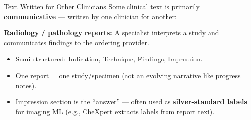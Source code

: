 \documentclass[aspectratio=169,11pt]{beamer}
\begin{document}
\begin{frame}{Text Written for Other Clinicians}
Some clinical text is primarily \textbf{communicative} --- written by one clinician for another:

\vspace{0.1em}
\textbf{Radiology / pathology reports:} A specialist interprets a study and communicates findings to the ordering provider.
\begin{itemize}[<+->]\setlength\itemsep{0.02em}
  \item Semi-structured: Indication, Technique, Findings, Impression.
  \item One report = one study/specimen (not an evolving narrative like progress notes).
  \item Impression section is the ``answer'' --- often used as \textbf{silver-standard labels} for imaging ML (e.g., CheXpert extracts labels from report text).
\end{itemize}

\end{frame}
\end{document}
